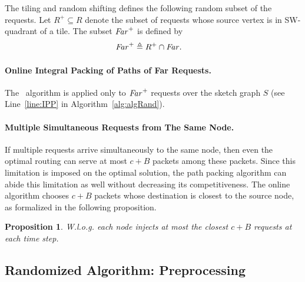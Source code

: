 \documentclass[11pt]{article}
\newtheorem{proposition}[theorem]{Proposition}
\newcommand{\route}{\text{\sc{ipp}}}
\newcommand{\IPP}{\route}
\newenvironment{proof sketch}[1]{\noindent {\emph{Proof sketch of #1:}}}{\hfill \qed}
\newcommand{\far}{\text{\emph{Far}}}
\begin{document}
The tiling and random shifting defines the following random subset of the requests. Let
$R^+\subseteq R$ denote the subset of requests whose source vertex is in SW-quadrant of a tile.
The subset $\far^+$ is defined by
\begin{align*}
  \far^+ &\triangleq R^+ \cap \far.
\end{align*}

\paragraph{Online Integral Packing of Paths of Far Requests.}
The \IPP\ algorithm is applied only to $\far^+$ requests
over the sketch graph $S$ (see Line~\ref{line:IPP} in
Algorithm~\ref{alg:algRand}).

\begin{comment}
In the randomized algorithm the reduction deals with the following issues: (1)~Handling requests only \emph{between} tiles (we deal with requests inside a tile separately), (2)~the \IPP\ algorithm the capacities of the sketch graph $S$ are \emph{not changed}, and (iii)~as before, a specific sink destination is added for each request. Hence, all we need is to add  sink nodes (see Figure~\ref{fig:st}).
\end{comment}

\paragraph{Multiple Simultaneous Requests from The Same Node.}
If multiple requests arrive simultaneously to the same
node, then even the optimal routing can serve at most $c+B$
packets among these packets. Since this limitation is
imposed on the optimal solution, the path packing algorithm
can abide this limitation as well without decreasing its
competitiveness. The online algorithm chooses $c+B$ packets
whose destination is closest to the source node, as
formalized in the following proposition.

\begin{proposition}\label{prop:filter}
    W.l.o.g. each node injects at most the closest $c+B$ requests at each time step.
\end{proposition}


\subsection{Randomized Algorithm: Preprocessing}\label{sec:preprocess}
\end{document}
